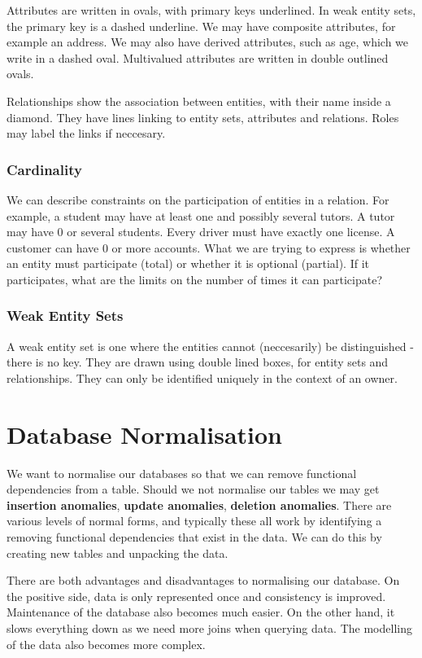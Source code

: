 \documentclass{article}
\begin{document}
	\par
	Attributes are written in ovals, with primary keys underlined. In weak entity sets, the primary key is a dashed underline. We may have composite attributes, for example an address. We may also have derived attributes, such as age, which we write in a dashed oval. Multivalued attributes are written in double outlined ovals. 
	
	\par 
	Relationships show the association between entities, with their name inside a diamond. They have lines linking to entity sets, attributes and relations. Roles may label the links if neccesary. 
	
	\subsubsection{Cardinality}
	We can describe constraints on the participation of entities in a relation. For example, a student may have at least one and possibly several tutors. A tutor may have 0 or several students. Every driver must have exactly one license. A customer can have 0 or more accounts. What we are trying to express is whether an entity must participate (total) or whether it is optional (partial). If it participates, what are the limits on the number of times it can participate? 
	
	\subsubsection{Weak Entity Sets}
	A weak entity set is one where the entities cannot (neccesarily) be distinguished - there is no key. They are drawn using double lined boxes, for entity sets and relationships. They can only be identified uniquely in the context of an owner.
	
	\section{Database Normalisation}
	We want to normalise our databases so that we can remove functional dependencies from a table. Should we not normalise our tables we may get \textbf{insertion anomalies}, \textbf{update anomalies}, \textbf{deletion anomalies}. There are various levels of normal forms, and typically these all work by identifying a removing functional dependencies that exist in the data. We can do this by creating new tables and unpacking the data.
	
	\par 
	There are both advantages and disadvantages to normalising our database. On the positive side, data is only represented once and consistency is improved. Maintenance of the database also becomes much easier. On the other hand, it slows everything down as we need more joins when querying data. The modelling of the data also becomes more complex.
	
\end{document}
